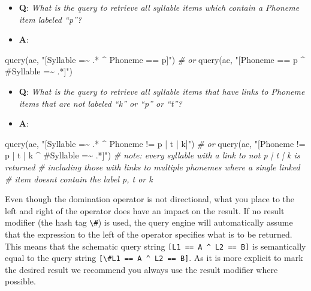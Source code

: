 \documentclass[
]{book}
\newenvironment{Shaded}{\begin{snugshade}}{\end{snugshade}}
\newcommand{\CommentTok}[1]{\textcolor[rgb]{0.56,0.35,0.01}{\textit{#1}}}
\newcommand{\FunctionTok}[1]{\textcolor[rgb]{0.00,0.00,0.00}{#1}}
\newcommand{\NormalTok}[1]{#1}
\newcommand{\StringTok}[1]{\textcolor[rgb]{0.31,0.60,0.02}{#1}}
\providecommand{\tightlist}{%
  \setlength{\itemsep}{0pt}\setlength{\parskip}{0pt}}
\begin{document}
\begin{itemize}
\tightlist
\item
  \textbf{Q}: \emph{What is the query to retrieve all syllable items which contain a Phoneme item labeled ``p''?}
\item
  \textbf{A}:
\end{itemize}

\begin{Shaded}
\begin{Highlighting}[]
\FunctionTok{query}\NormalTok{(ae, }\StringTok{"[Syllable =\textasciitilde{} .* \^{} Phoneme == p]"}\NormalTok{) }
\CommentTok{\# or }
\FunctionTok{query}\NormalTok{(ae, }\StringTok{"[Phoneme == p \^{} \#Syllable =\textasciitilde{} .*]"}\NormalTok{)}
\end{Highlighting}
\end{Shaded}

\begin{itemize}
\tightlist
\item
  \textbf{Q}: \emph{What is the query to retrieve all syllable items that have links to Phoneme items that are not labeled ``k'' or ``p'' or ``t''?}
\item
  \textbf{A}:
\end{itemize}

\begin{Shaded}
\begin{Highlighting}[]
\FunctionTok{query}\NormalTok{(ae, }\StringTok{"[Syllable =\textasciitilde{} .* \^{} Phoneme != p | t | k]"}\NormalTok{)}
\CommentTok{\# or }
\FunctionTok{query}\NormalTok{(ae, }\StringTok{"[Phoneme != p | t | k \^{} \#Syllable =\textasciitilde{} .*]"}\NormalTok{)}
\CommentTok{\# note: every syllable with a link to not p | t | k is returned}
\CommentTok{\# including those with links to multiple phonemes where a single linked}
\CommentTok{\# item doesn\textquotesingle{}t contain the label \textquotesingle{}p\textquotesingle{}, \textquotesingle{}t\textquotesingle{} or \textquotesingle{}k\textquotesingle{}}
\end{Highlighting}
\end{Shaded}

Even though the domination operator is not directional, what you place to the left and right of the operator does have an impact on the result. If no result modifier (the hash tag \texttt{\textbackslash{}\#}) is used, the query engine will automatically assume that the expression to the left of the operator specifies what is to be returned. This means that the schematic query string \texttt{{[}L1\ ==\ A\ \^{}\ L2\ ==\ B{]}} is semantically equal to the query string \texttt{{[}\textbackslash{}\#L1\ ==\ A\ \^{}\ L2\ ==\ B{]}}. As it is more explicit to mark the desired result we recommend you always use the result modifier where possible.
\end{document}
